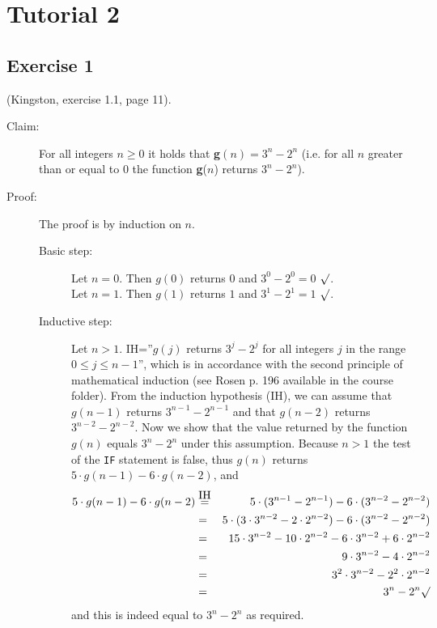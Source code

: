 \documentclass[english]{article}
\begin{document}

\pagestyle{fancy}
 \chead{}


\section*{Tutorial 2}

\subsection*{Exercise 1}
(Kingston, exercise 1.1, page 11).
\begin{algorithmic}
 \ELSE
 \ENDIF
 \STATE{$\rbrace$}
\end{algorithmic} 
\begin{description}
  \item[Claim:] For all integers $n \geq 0$ it holds that
{\bf g}$(n)=3^n - 2^n$ (i.e. for all $n$ greater than or equal to $0$
 the function {\bf g}($n$) returns $3^n - 2^n$).
  \item[Proof:] The proof is by induction on $n$.
  \begin{description}
    \item[Basic step:] Let $n=0$. Then
    $g(0)$ returns $0$ and $3^0-2^0=0$ $\surd$.\\
 Let $n=1$. Then $g(1)$ returns $1$ and $3^1-2^1=1$ $\surd$.
	\item[Inductive step:] Let $n>1$. IH=''$g(j)$ returns $3^j-2^j$ for all 
integers $j$ in the range $0 \leq j \leq n-1$'', which is in accordance with the second principle of mathematical induction (see Rosen p. 196 available in the course folder). From the induction hypothesis (IH), we can assume that $g(n-1)$ returns $3^{n-1}-2^{n-1}$ and that  $g(n-2)$ returns $3^{n-2}-2^{n-2}$. Now we show that the value returned by the function $g(n)$ equals $3^n - 2^n$ under this assumption. Because $n>1$ the test of the {\tt IF} statement is false, thus $g(n)$ returns $5 \cdot g(n-1)-6\cdot g(n-2)$, and
	  \begin{eqnarray*}	  
	  5 \cdot g(n-1) - 6 \cdot g(n-2) &\stackrel{\mbox{IH}}{=}& 5 \cdot (3^{n-1}-2^{n-1}) - 6 \cdot (3^{n-2}-2^{n-2}) \\
	  &=& 5 \cdot (3 \cdot 3^{n-2} - 2 \cdot 2^{n-2}) - 6 \cdot (3^{n-2}-2^{n-2}) \\
	  &=& 15 \cdot 3^{n-2} - 10 \cdot 2^{n-2} - 6 \cdot 3^{n-2} + 6 \cdot 2^{n-2} \\
	  &=& 9 \cdot 3^{n-2} - 4 \cdot 2^{n-2} \\
	  &=& 3^2 \cdot 3^{n-2} - 2^2 \cdot 2^{n-2} \\
	  &=& 3^n - 2^n \surd
	  \end{eqnarray*}
and this is indeed equal to $3^n - 2^n$ as required. 
  \end{description} 
\end{description}
\end{document}
